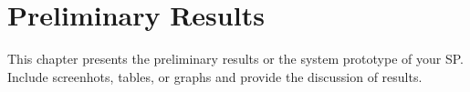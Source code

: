 \chapter{Preliminary Results}
This chapter  presents the preliminary results or the system prototype of your SP.  Include screenhots, tables, or graphs and provide the discussion of results.